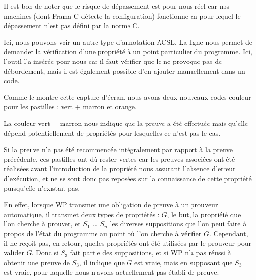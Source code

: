 

\begin{Information}
Il est bon de noter que le risque de dépassement est pour nous réel car nos
machines (dont Frama-C détecte la configuration) fonctionne en 
pour lequel le dépassement n'est pas défini par la norme C.
\end{Information}


Ici, nous pouvons voir un autre type d'annotation ACSL. La 
ligne  nous permet de demander la vérification 
d'une propriété à un point particulier du programme. Ici, l'outil l'a 
insérée pour nous car il faut vérifier que le  ne provoque pas de 
débordement, mais il est également possible d'en ajouter manuellement dans 
un code.



Comme le montre cette capture d'écran, nous avons deux nouveaux codes couleur
pour les pastilles : vert + marron et orange.



La couleur vert + marron nous indique que la preuve a été effectuée mais 
qu'elle dépend potentiellement de propriétés pour lesquelles ce n'est pas le
cas.



Si  la preuve n'a pas été recommencée intégralement par rapport à la preuve 
précédente, ces pastilles ont dû rester vertes car les preuves associées ont
été réalisées avant l'introduction de la propriété nous assurant l'absence 
d'erreur d'exécution, et ne se sont donc pas reposées sur la connaissance de
cette propriété puisqu'elle n'existait pas.



En effet, lorsque WP transmet une obligation de preuve à un prouveur automatique,
il transmet deux types de propriétés : $G$, le but, la propriété 
que l'on cherche à prouver, et $S_1$ ... $S_n$ les diverses suppositions que l'on
peut faire à propos de l'état du programme au point où l'on cherche à vérifier $G$.
Cependant, il ne reçoit pas, en retour, quelles propriétés ont été utilisées par
le prouveur pour valider $G$. Donc si $S_3$ fait partie des suppositions, et si
WP n'a pas réussi à obtenir une preuve de $S_3$, il indique que $G$ est vraie, mais
en supposant que $S_3$ est vraie, pour laquelle nous n'avons actuellement pas
établi de preuve.



